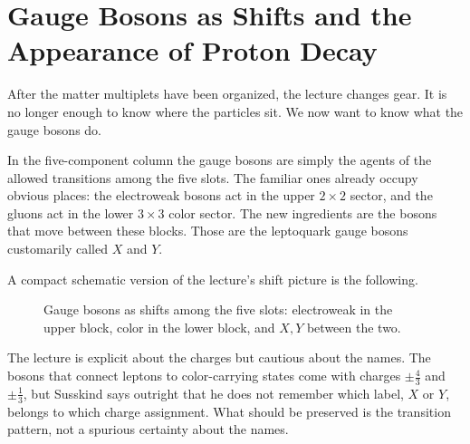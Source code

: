 \section{Gauge Bosons as Shifts and the Appearance of Proton Decay}

After the matter multiplets have been organized, the lecture changes gear. It is no longer enough to know where the particles sit. We now want to know what the gauge bosons do.

In the five-component column the gauge bosons are simply the agents of the allowed transitions among the five slots. The familiar ones already occupy obvious places: the electroweak bosons act in the upper \(2\times 2\) sector, and the gluons act in the lower \(3\times 3\) color sector. The new ingredients are the bosons that move between these blocks. Those are the leptoquark gauge bosons customarily called \(X\) and \(Y\).

A compact schematic version of the lecture's shift picture is the following.

\begin{figure}
\centering
{}
\caption{Gauge bosons as shifts among the five slots: electroweak in the upper block, color in the lower block, and \(X,Y\) between the two.}
\end{figure}

The lecture is explicit about the charges but cautious about the names. The bosons that connect leptons to color-carrying states come with charges \(\pm \tfrac43\) and \(\pm \tfrac13\), but Susskind says outright that he does not remember which label, \(X\) or \(Y\), belongs to which charge assignment. What should be preserved is the transition pattern, not a spurious certainty about the names.


